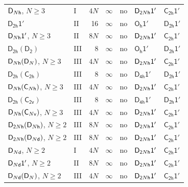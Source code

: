 \documentclass[10pt,a4paper]{article}
\makeatletter
\def\grouprule#1#2{\noalign{\marks\LTgroupmarks{\the\belowrulesep}\nobreak\vskip#1%
  \vskip\aboverulesep}\multispan\LT@cols\unskip{\leaders\hrule\@height#2\hfill\kern\z@}\cr
  \noalign{\penalty\LTrulebreak\vskip\belowrulesep\global\@lastruleclass\z@}}
\numberwithin{equation}{section}
\newcommand{\grp}[1]{\mathsf{#1}}
\makeatother
\begin{document}
{\begin{longtable}{@{}llrrlll@{}}
$\grp{D_{\mathnormal{N}h}}$, $N \ge 3$ & I & $4N$ & $\infty$ & no & $\grp{D_{2\mathnormal{N}h}1'}$ & \href{C2h-1p.pdf}{$\grp{C_{2h}1'}$}\\
\href{D2h-1p.pdf}{$\grp{D_{2h}1'}$} & II & 16 & $\infty$ & no & \href{Oh-1p.pdf}{$\grp{O_{h}1'}$} & \href{D2h-1p.pdf}{$\grp{D_{2h}1'}$}\\
$\grp{D_{\mathnormal{N}h}1'}$, $N \ge 3$ & II & $8N$ & $\infty$ & no & $\grp{D_{2\mathnormal{N}h}1'}$ & \href{C2h-1p.pdf}{$\grp{C_{2h}1'}$}\\
\href{D2h-D2.pdf}{$\grp{D_{2h}}(\grp{D_{2}})$} & III & 8 & $\infty$ & no & \href{Oh-1p.pdf}{$\grp{O_{h}1'}$} & \href{D2h-1p.pdf}{$\grp{D_{2h}1'}$}\\
$\grp{D_{\mathnormal{N}h}}(\grp{D_{\mathnormal{N}}})$, $N \ge 3$ & III & $4N$ & $\infty$ & no & $\grp{D_{2\mathnormal{N}h}1'}$ & \href{C2h-1p.pdf}{$\grp{C_{2h}1'}$}\\
\href{D2h-C2h.pdf}{$\grp{D_{2h}}(\grp{C_{2h}})$} & III & 8 & $\infty$ & no & \href{D4h-1p.pdf}{$\grp{D_{4h}1'}$} & \href{D2h-1p.pdf}{$\grp{D_{2h}1'}$}\\
$\grp{D_{\mathnormal{N}h}}(\grp{C_{\mathnormal{N}h}})$, $N \ge 3$ & III & $4N$ & $\infty$ & no & $\grp{D_{2\mathnormal{N}h}1'}$ & \href{C2h-1p.pdf}{$\grp{C_{2h}1'}$}\\
\href{D2h-C2v.pdf}{$\grp{D_{2h}}(\grp{C_{2v}})$} & III & 8 & $\infty$ & no & \href{D4h-1p.pdf}{$\grp{D_{4h}1'}$} & \href{D2h-1p.pdf}{$\grp{D_{2h}1'}$}\\
$\grp{D_{\mathnormal{N}h}}(\grp{C_{\mathnormal{N}v}})$, $N \ge 3$ & III & $4N$ & $\infty$ & no & $\grp{D_{2\mathnormal{N}h}1'}$ & \href{C2h-1p.pdf}{$\grp{C_{2h}1'}$}\\
$\grp{D_{2\mathnormal{N}h}}(\grp{D_{\mathnormal{N}h}})$, $N \ge 2$ & III & $8N$ & $\infty$ & no & $\grp{D_{2\mathnormal{N}h}1'}$ & \href{C2h-1p.pdf}{$\grp{C_{2h}1'}$}\\
$\grp{D_{2\mathnormal{N}h}}(\grp{D_{\mathnormal{N}d}})$, $N \ge 2$ & III & $8N$ & $\infty$ & no & $\grp{D_{2\mathnormal{N}h}1'}$ & \href{C2h-1p.pdf}{$\grp{C_{2h}1'}$}\\
\grouprule{0pt}{\lightrulewidth}
$\grp{D_{\mathnormal{N}d}}$, $N \ge 2$ & I & $4N$ & $\infty$ & no & $\grp{D_{2\mathnormal{N}h}1'}$ & \href{C2h-1p.pdf}{$\grp{C_{2h}1'}$}\\
$\grp{D_{\mathnormal{N}d}1'}$, $N \ge 2$ & II & $8N$ & $\infty$ & no & $\grp{D_{2\mathnormal{N}h}1'}$ & \href{C2h-1p.pdf}{$\grp{C_{2h}1'}$}\\
$\grp{D_{\mathnormal{N}d}}(\grp{D_{\mathnormal{N}}})$, $N \ge 2$ & III & $4N$ & $\infty$ & no & $\grp{D_{2\mathnormal{N}h}1'}$ & \href{C2h-1p.pdf}{$\grp{C_{2h}1'}$}\\

\end{longtable}}
\end{document}
